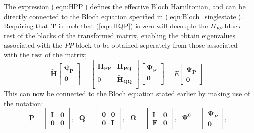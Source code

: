 \documentclass[12pt]{article}
\begin{document}
\noindent The expression (\ref{eqn:HPP}) defines the effective Bloch Hamiltonian, and can be directly connected to the Bloch equation
specified in (\ref{eqn:Bloch_singlestate}). Requiring that $\mathbf{T}$ is such that (\ref{eqn:HQP}) is zero will decouple the
$H_{PP}$ block rest of the blocks of the transformed matrix, enabling the obtain eigenvalues associated with the $PP$ block to be obtained
seperately from those associated with the rest of the matrix;
\begin{equation}
\mathbf{\tilde{H}}
\begin{bmatrix}
 \boldsymbol{\psi_{P}} \\ 
 \mathbf{0} \\ 
\end{bmatrix}
=
\begin{bmatrix}
 \mathbf{\tilde{H}_{PP}} & \mathbf{\tilde{H}_{PQ}} \\ 
 0                       & \mathbf{\tilde{H}_{QQ}} \\ 
\end{bmatrix} 
\begin{bmatrix}
 \boldsymbol{\Psi_{P}} \\ 
 \mathbf{0} \\ 
\end{bmatrix} 
= E 
\begin{bmatrix}
\boldsymbol{\Psi_{P}} \\ 
\mathbf{0} 
\end{bmatrix}.
\label{eqn:TransEvalEqnSimple}
\end{equation}
This can now be connected to the Bloch equation stated earlier by making use of the notation;
\begin{equation}
\mathbf{P} =  
\begin{bmatrix}
\mathbf{I} & \mathbf{0} \\ 
\mathbf{0} & \mathbf{0} 
\end{bmatrix},
\text{ \ \ \ }
\mathbf{Q} =  
\begin{bmatrix}
\mathbf{0} & \mathbf{0} \\ 
\mathbf{0} & \mathbf{I} 
\end{bmatrix},
\text{ \ \ \ }
\boldsymbol{\Omega} =  
\begin{bmatrix}
\mathbf{I} & \mathbf{0} \\ 
\mathbf{F} & \mathbf{0} 
\end{bmatrix},
\text{ \ \ \ }
\boldsymbol{\Psi}^{0} =
\begin{bmatrix}
\boldsymbol{\Psi}_{P} \\
\mathbf{0} 
\end{bmatrix},
\end{equation}
\end{document}
